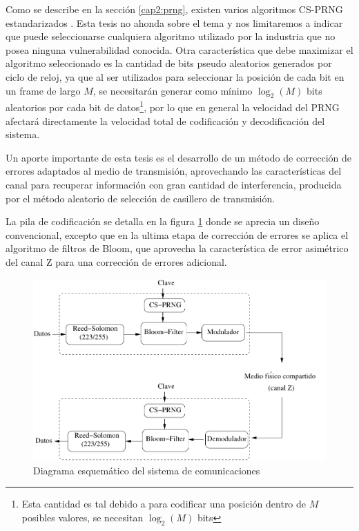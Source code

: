 Como se describe en la sección \ref{cap2:prng}, existen varios algoritmos CS-PRNG estandarizados \cite{gallagherfips}. Esta tesis no ahonda sobre el tema y nos limitaremos a indicar que puede seleccionarse cualquiera algoritmo utilizado por la industria que no posea ninguna vulnerabilidad conocida. Otra característica que debe maximizar el algoritmo seleccionado es la cantidad de bits pseudo aleatorios generados por ciclo de reloj, ya que al ser utilizados para seleccionar la posición de cada bit en un frame de largo $M$, se necesitarán generar como mínimo $\log_2(M)$ bits aleatorios por cada bit de datos\footnote{Esta cantidad es tal debido a para codificar una posición dentro de $M$ posibles valores, se necesitan $\log_2(M)$ bits}, por lo que en general la velocidad del PRNG afectará directamente la velocidad total de codificación y decodificación del sistema.

Un aporte importante de esta tesis es el desarrollo de un método de corrección de errores adaptados al medio de transmisión, aprovechando las características del canal para recuperar información con gran cantidad de interferencia, producida por el método aleatorio de selección de casillero de transmisión.

La pila de codificación se detalla en la figura \ref{fig_comstack} donde se aprecia un diseño convencional, excepto que en la ultima etapa de corrección de errores se aplica el algoritmo de filtros de Bloom, que aprovecha la característica de error asimétrico del canal Z para una corrección de errores adicional.

\begin{figure}[t]
\centering
\includegraphics[width=4.5in]{graphs/Soft-stack3}
\caption{Diagrama esquemático del sistema de comunicaciones}
\label{fig_comstack}
\end{figure}

